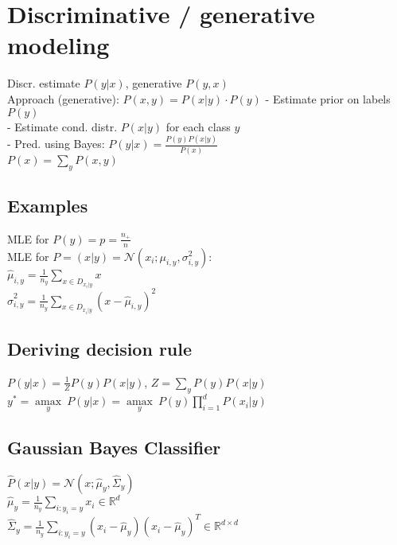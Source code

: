 \section*{Discriminative / generative modeling}
Discr. estimate $P(y|x)$, generative $P(y,x)$ \\
Approach (generative): $P(x,y) = P(x|y) \cdot P(y)$
- Estimate prior on labels $P(y)$\\
- Estimate cond. distr. $P(x|y)$ for each class $y$\\
- Pred. using Bayes:
$P(y|x) = \frac{P(y) P(x|y)}{P(x)}$\\
$P(x) = \sum_y P(x,y)$


\subsection*{Examples}
MLE for $P(y) = p = \frac{n_+}{n}$\\
MLE for $P=(x|y) = \mathcal{N}(x_i;\mu_{i,y}, \sigma_{i,y}^2)$:\\
$\hat{\mu}_{i,y} = \frac{1}{n_y} \sum_{x\in D_{x_i|y}} x$\\
$\hat{\sigma}_{i,y}^2 = \frac{1}{n_y} \sum_{x\in D_{x_i|y}} (x-\hat{\mu}_{i,y})^2$

\subsection*{Deriving decision rule}
$P(y|x) = \frac{1}{Z} P(y)P(x|y)$, $Z = \sum_y P(y) P(x|y)$\\
$y^* = \underset{y}{\operatorname{amax}} ~ P(y|x) = 
\underset{y}{\operatorname{amax}} ~ P(y) \prod_{i=1}^d P(x_i|y)$

\subsection*{Gaussian Bayes Classifier}
$\hat{P}(x|y) = \mathcal{N}(x ; \hat{\mu}_y, \hat{\Sigma}_y)$\\
$\hat{\mu}_{y} = \frac{1}{n_y} \sum_{i:y_i=y} x_i \in \mathbb{R}^d$\\
$\hat{\Sigma}_{y} = \frac{1}{n_y} \sum_{i:y_i=y} (x_i - \hat{\mu}_{y})(x_i-\hat{\mu}_y)^T \in \mathbb{R}^{d \times d}$

